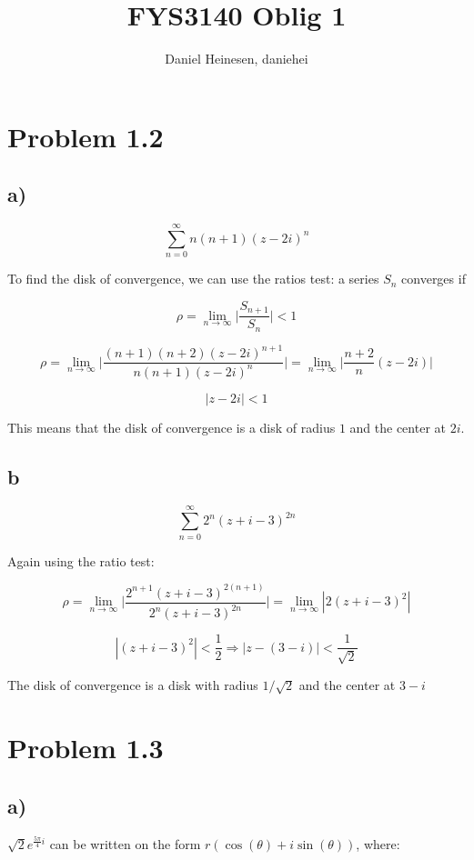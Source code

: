 \documentclass[a4paper,norsk, 10pt]{article}
\title{FYS3140 Oblig 1}
\author{Daniel Heinesen, daniehei}
\begin{document}
\maketitle

\section*{Problem 1.2}
\subsection*{a)}

$$
\sum_{n=0}^{\infty} n(n+1)(z-2i)^n
$$

To find the disk of convergence, we can use the ratios test: a series $S_n$ converges if

\begin{equation}
\rho = \lim_{n\to \infty} \big| {\frac{S_{n+1}}{S_n}} \big| < 1
\end{equation}

$$
\rho = \lim_{n\to \infty} \big| \frac{(n+1)(n+2)(z-2i)^{n+1}}{n(n+1)(z-2i)^n} \big|= \lim_{n\to \infty} \big| \frac{n+2}{n} (z-2i) \big|
$$

$$
|z-2i| < 1
$$

This means that the disk of convergence is a disk of radius $1$ and the center at $2i$.

\subsection*{b}

$$
\sum_{n=0}^{\infty} 2^n(z+i-3)^{2n}
$$

Again using the ratio test:

$$
\rho = \lim_{n\to \infty} \big|\frac{2^{n+1}(z+i-3)^{2(n+1)}}{2^n(z+i-3)^{2n}} \big| =\lim_{n\to \infty} |2(z+i-3)^2|
$$

$$
|(z+i-3)^2| < \frac{1}{2} \Rightarrow |z-(3-i)| < \frac{1}{\sqrt{2}} 
$$

The disk of convergence is a disk with radius $1/\sqrt{2}$ and the center at $3-i$

\section*{Problem 1.3}
\subsection*{a)}
$\sqrt{2} e^{\frac{5\pi}{4}i}$ can be written on the form $r(\cos(\theta) + i\sin(\theta))$, where:
\end{document}
